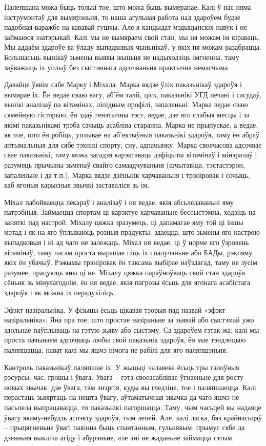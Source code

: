 Палепшана можа быць толькі тое, што можа быць вымеранае. Калі ў нас няма інструмэнтаў для вымярэньня, то наша агульная работа над здароўем будзе падобная варажбе на кававай гушчы. Але я кандыдат мэдыцынскіх навук і не займаюся эзатэрыкай. Калі мы не вымяраем свой стан, мы ня можам ім кіраваць. Мы аддаём здароўе ва ўладу выпадковых чыньнікаў, у якіх ня можам разабрацца. Большасьць вынікаў зьмены выявы жыцьця не надыходзіць імгненна, таму заўважыць іх уплыў без сыстэмнага адсочваньня практычна немагчыма.

Давайце ўявім сабе Марку і Міхала. Марка вядзе ўлік паказьнікаў здароўя і вымярае іх. Ён ведае сваю вагу, аб'ём таліі, ціск, паказьнікі УГД печані і сасудаў, вынікі аналізаў па вітамінах, ліпідным профілі, запаленьні. Марка ведае сваю сямейную гісторыю, ён здаў генэтычны тэст, ведае, дзе яго слабыя месцы і за якімі паказьнікамі трэба сачыць асабліва старанна. Марка не прыпускае, а ведае, як тое, што ён робіць, уплывае на аб'ектыўныя паказьнікі здароўя, таму ён абраў аптымальныя для сябе тэхнікі спорту, сну, адпачынку. Марка своечасова адсочвае свае паказьнікі, таму можа загадзя карэктаваць дэфіцыты вітамінаў і мінэралаў і разумець прычыны зьменаў свайго самаадчуваньня (шчытавіца, тэстастэрон, запаленьне і да т.п.). Марка вядзе дзёньнік харчаваньня і трэніровак і сочыць, каб ягоныя карысныя звычкі заставаліся зь ім.

Міхал пабойваецца лекараў і аналізаў і ня ведае, якія абсьледаваньні яму патрэбныя. Займаецца спортам ці карэктуе харчаваньне бессыстэмна, ходзіць на заняткі пад настрой. Міхалу цяжка зразумець, ці дапамагае яму той ці іншы мэтад і як на яго ўплываюць розныя прадукты: здаецца, што зьмены яго настрою выпадковыя і ні ад чаго не залежаць. Міхал ня ведае, ці ў норме яго ўзровень вітамінаў, таму часам проста вырашае піць іх спалучэньне або БАДы, рэкляму якіх ён убачыў. Рэжымы трэніровак ён таксама выбірае наўздагад, таму не зусім разумее, працуюць яны ці не. Міхалу цяжка параўноўваць свой стан здароўя сёньня зь мінулагоднім, ён ня ведае, якія пагрозы ёсьць для ягонага асабістага здароўя і як можна іх перадухіліць.

Эфэкт назіральніка. У фізыцы ёсьць цікавая тэорыя пад назвай «эфэкт назіральніка». Яна пра тое, што простае назіраньне за зьявай або сыстэмай ужо здольнае паўплываць на гэтую зьяву або сыстэму. Са здароўем гэтак жа: калі мы проста пачынаем адсочваць любы свой паказьнік здароўя, ён мае тэндэнцыю паляпшацца, нават калі мы яшчэ нічога не рабілі для яго паляпшэньня.

Кантроль паказьнікаў паляпшае іх. У жыцьці чалавека ёсьць тры галоўныя рэсурсы: час, грошы і ўвага. Увага – гэта своеасаблівае ўгнаеньне для росту новых звычак: дзе ўвага, там энэргія, куды вы гледзіце, тое і паляпшаецца. Калі перастаць зьвяртаць на нешта ўвагу, аўтаматычная звычка да чаго яшчэ не пасьпела выпрацавацца, то паказьнікі пагоршацца. Таму, чым часьцей вы надаяце ўвагу якаму-небудзь аспэкту здароўя, тым лепей. Але, калі ласка, бяз крайнасьцяў – прыцягненьне ўвагі павінна быць спантанным, гульнявым: прымус сябе да дзеяньня выкліча агіду і абурэньне, але ані не жаданьне займацца гэтым.

